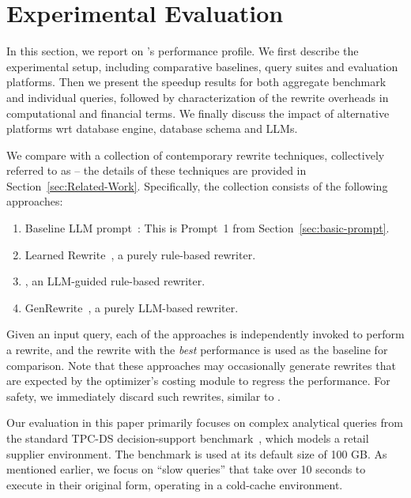 \vspace{-0.1in}
\section{Experimental Evaluation}
\label{sec:exp}

In this section, we report on \lithe's performance profile. We first describe the experimental setup, including comparative baselines, query suites and evaluation platforms. Then we present the speedup results for both aggregate benchmark and individual queries,  followed by characterization of the rewrite overheads in computational and financial terms. We finally discuss the impact of alternative platforms wrt database engine, database schema and LLMs.

%
We compare \lithe with a collection of contemporary rewrite techniques, collectively referred to as {\sota} -- the details of these techniques are provided in Section~\ref{sec:Related-Work}. Specifically, the \sota collection consists of the following approaches:
\vspace{-0.1in}
\begin{enumerate}\denselist
\item Baseline LLM prompt~\cite{Genrewrite}: This is Prompt~1 from Section~\ref{sec:basic-prompt}.
\item Learned Rewrite~\cite{Learned_Rewrite}, a purely rule-based rewriter.
\item \llmrsq \cite{LLMR2}, an LLM-guided rule-based rewriter.
\item GenRewrite~\cite{Genrewrite}, a purely LLM-based rewriter.
\end{enumerate}
Given an input query, each of the \sota approaches is independently invoked to perform a rewrite, and the rewrite with the \emph{best} performance is used as the baseline for comparison. 
%
Note that these approaches may occasionally generate rewrites that are expected by the optimizer's costing module to regress the performance. For safety, we immediately discard such rewrites, similar to \lithe.
%

%
Our evaluation in this paper primarily focuses on complex analytical queries from the standard TPC-DS decision-support benchmark~\cite{tpcds}, which models a retail supplier environment. The benchmark is used at its default size of 100 GB.
As mentioned earlier, we focus on ``slow queries'' that take over 10 seconds to execute in their original form, operating in a cold-cache environment.

